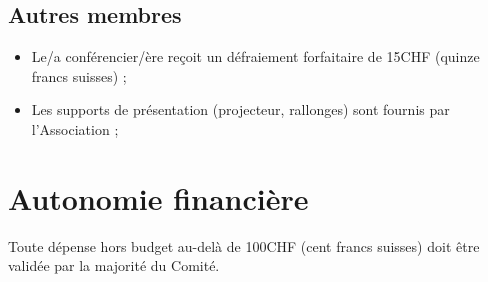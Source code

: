 \documentclass[12pt,twoside]{report}
\begin{document}
\subsection*{Autres membres}
\begin{itemize}
\item Le/a conférencier/ère reçoit un défraiement forfaitaire de 15CHF (quinze francs suisses) ;
\item Les supports de présentation (projecteur, rallonges) sont fournis par l’Association ;
\end{itemize}

\section*{Autonomie financière}
Toute dépense hors budget au-delà de 100CHF (cent francs suisses) doit être validée par la majorité du Comité.
\end{document}
